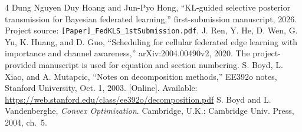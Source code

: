 \begin{thebibliography}{4}
Dung Nguyen Duy Hoang and Jun-Pyo Hong, ``KL-guided selective posterior transmission for Bayesian federated learning,'' first-submission manuscript, 2026. Project source: \texttt{[Paper]\_FedKLS\_1stSubmission.pdf}.
J. Ren, Y. He, D. Wen, G. Yu, K. Huang, and D. Guo, ``Scheduling for cellular federated edge learning with importance and channel awareness,'' arXiv:2004.00490v2, 2020. The project-provided manuscript is used for equation and section numbering.
S. Boyd, L. Xiao, and A. Mutapcic, ``Notes on decomposition methods,'' EE392o notes, Stanford University, Oct. 1, 2003. [Online]. Available: \url{https://web.stanford.edu/class/ee392o/decomposition.pdf}
S. Boyd and L. Vandenberghe, \emph{Convex Optimization}. Cambridge, U.K.: Cambridge Univ. Press, 2004, ch.~5.
\end{thebibliography}
